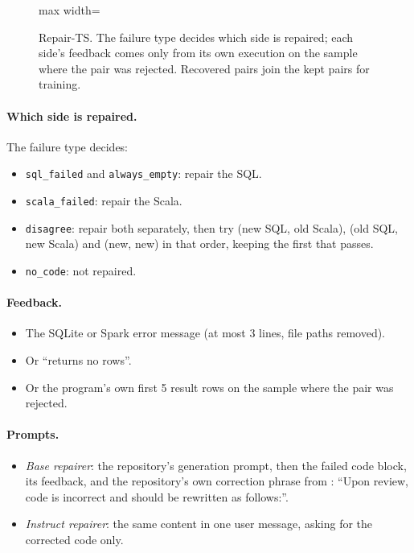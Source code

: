 \begin{figure}[htbp]
\centering
\begin{adjustbox}{max width=\linewidth}\end{adjustbox}
\caption{Repair-TS. The failure type decides which side is repaired; each side's feedback comes only from its own
execution on the sample where the pair was rejected. Recovered pairs join the kept pairs for training.}
\label{fig:repair-flow}
\end{figure}

\paragraph{Which side is repaired.} The failure type decides:
\begin{itemize}
\item \texttt{sql\_failed} and \texttt{always\_empty}: repair the SQL.
\item \texttt{scala\_failed}: repair the Scala.
\item \texttt{disagree}: repair both separately, then try (new SQL, old Scala), (old SQL, new Scala) and (new, new) in
that order, keeping the first that passes.
\item \texttt{no\_code}: not repaired.
\end{itemize}

\paragraph{Feedback.}
\begin{itemize}
\item The SQLite or Spark error message (at most 3 lines, file paths removed).
\item Or ``returns no rows''.
\item Or the program's own first 5 result rows on the sample where the pair was rejected.
\end{itemize}

\paragraph{Prompts.}
\begin{itemize}
\item \emph{Base repairer}: the repository's generation prompt, then the failed code block, its feedback, and the
repository's own correction phrase from : ``Upon review, code is incorrect and should be
rewritten as follows:''.
\item \emph{Instruct repairer}: the same content in one user message, asking for the corrected code only.
\end{itemize}

